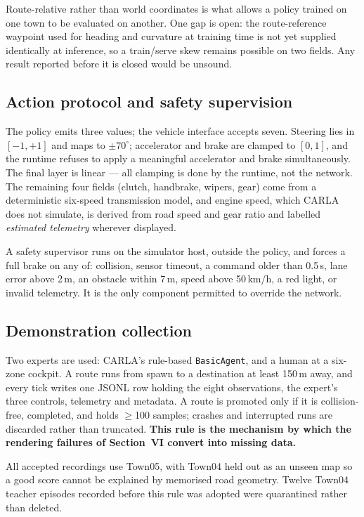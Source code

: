 \documentclass[conference]{IEEEtran}
\begin{document}
Route-relative rather than world coordinates is what allows a policy
trained on one town to be evaluated on another. One gap is open: the
route-reference waypoint used for heading and curvature at training time
is not yet supplied identically at inference, so a train/serve skew
remains possible on two fields. Any result reported before it is closed
would be unsound.

\subsection{Action protocol and safety supervision}

The policy emits three values; the vehicle interface accepts seven.
Steering lies in $[-1,+1]$ and maps to $\pm70^{\circ}$; accelerator and
brake are clamped to $[0,1]$, and the runtime refuses to apply a
meaningful accelerator and brake simultaneously. The final layer is
linear --- all clamping is done by the runtime, not the network. The
remaining four fields (clutch, handbrake, wipers, gear) come from a
deterministic six-speed transmission model, and engine speed, which
CARLA does not simulate, is derived from road speed and gear ratio and
labelled \emph{estimated telemetry} wherever displayed.

A safety supervisor runs on the simulator host, outside the policy, and
forces a full brake on any of: collision, sensor timeout, a command
older than 0.5\,s, lane error above 2\,m, an obstacle within 7\,m, speed
above 50\,km/h, a red light, or invalid telemetry. It is the only
component permitted to override the network.

\subsection{Demonstration collection}

Two experts are used: CARLA's rule-based \texttt{BasicAgent}, and a
human at a six-zone cockpit. A route runs from spawn to a destination at
least 150\,m away, and every tick writes one JSONL row holding the eight
observations, the expert's three controls, telemetry and metadata. A
route is promoted only if it is collision-free, completed, and holds
$\geq$100 samples; crashes and interrupted runs are discarded rather
than truncated. \textbf{This rule is the mechanism by which the
rendering failures of Section~VI convert into missing data.}

All accepted recordings use Town05, with Town04 held out as an unseen
map so a good score cannot be explained by memorised road geometry.
Twelve Town04 teacher episodes recorded before this rule was adopted
were quarantined rather than deleted.
\end{document}

